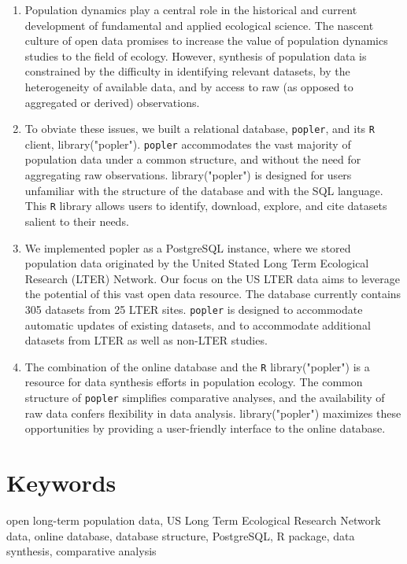 \documentclass{article}\usepackage[]{graphicx}\usepackage[]{color}
\begin{document}
\begin{enumerate}

  \item Population dynamics play a central role in the historical and current development of fundamental and applied ecological science. The nascent culture of open data promises to increase the value of population dynamics studies to the field of ecology. However, synthesis of population data is constrained by the difficulty in identifying relevant datasets, by the heterogeneity of available data, and by access to raw (as opposed to aggregated or derived) observations.
  
  \item To obviate these issues, we built a relational database, \texttt{popler}, and its \texttt{R} client, library("popler"). \texttt{popler} accommodates the vast majority of population data under a common structure, and without the need for aggregating raw observations. library("popler") is  designed for users unfamiliar with the structure of the database and with the SQL language. This \texttt{R} library allows users to identify, download, explore, and cite datasets salient to their needs.
  
  \item We implemented popler as a PostgreSQL instance, where we stored population data originated by the United Stated Long Term Ecological Research (LTER) Network. Our focus on the US LTER data aims to leverage the potential of this vast open data resource. The database currently contains 305 datasets from 25 LTER sites. \texttt{popler} is designed to accommodate automatic updates of existing datasets, and to accommodate additional datasets from LTER as well as non-LTER studies.
  
  \item The combination of the online database and the \texttt{R} library("popler") is a resource for data synthesis efforts in population ecology. The common structure of \texttt{popler} simplifies comparative analyses, and the availability of raw data confers flexibility in data analysis. library("popler") maximizes these opportunities by providing a user-friendly interface to the online database.

   \end{enumerate}
\section*{Keywords}
\linenumbers
open long-term population data, US Long Term Ecological Research Network data, online database, database structure, PostgreSQL, R package, data synthesis, comparative analysis
\end{document}
